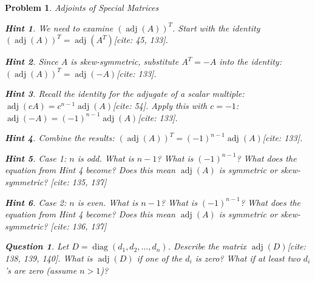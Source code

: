 \documentclass[12pt]{article}
\newtheorem{problem}{Problem}[section]
\newtheorem{question}{Question}[problem]
\theoremstyle{definition}
\newtheorem{hint}{Hint}[question]
\newcommand{\adj}{\operatorname{adj}}
\begin{document}
\begin{problem}{Adjoints of Special Matrices}
        \begin{hint}
            We need to examine $(\adj(A))^T$. Start with the identity $(\adj(A))^T = \adj(A^T)$[cite: 45, 133].
        \end{hint}
        \begin{hint}
            Since $A$ is skew-symmetric, substitute $A^T = -A$ into the identity: $(\adj(A))^T = \adj(-A)$[cite: 133].
        \end{hint}
        \begin{hint}
            Recall the identity for the adjugate of a scalar multiple: $\adj(cA) = c^{n-1} \adj(A)$[cite: 54]. Apply this with $c=-1$: $\adj(-A) = (-1)^{n-1} \adj(A)$[cite: 133].
        \end{hint}
        \begin{hint}
            Combine the results: $(\adj(A))^T = (-1)^{n-1} \adj(A)$[cite: 133].
        \end{hint}
        \begin{hint}
            Case 1: $n$ is odd. What is $n-1$? What is $(-1)^{n-1}$? What does the equation from Hint 4 become? Does this mean $\adj(A)$ is symmetric or skew-symmetric? [cite: 135, 137]
        \end{hint}
        \begin{hint}
            Case 2: $n$ is even. What is $n-1$? What is $(-1)^{n-1}$? What does the equation from Hint 4 become? Does this mean $\adj(A)$ is symmetric or skew-symmetric? [cite: 136, 137]
        \end{hint}
    

    \begin{question}
        Let $D = \operatorname{diag}(d_1, d_2, \dots, d_n)$. Describe the matrix $\adj(D)$[cite: 138, 139, 140]. What is $\adj(D)$ if one of the $d_i$ is zero? What if at least two $d_i$'s are zero (assume $n > 1$)?
    \end{question}
    

\end{problem}
\end{document}
